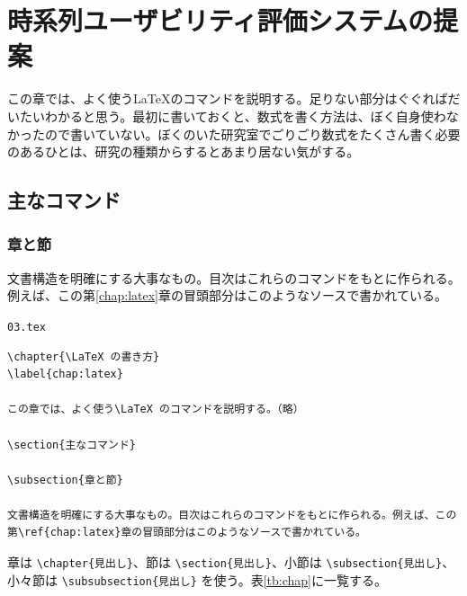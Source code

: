 \chapter{時系列ユーザビリティ評価システムの提案}
\label{chap:sequential}

この章では、よく使う\LaTeX のコマンドを説明する。足りない部分はぐぐればだいたいわかると思う。最初に書いておくと、数式を書く方法は、ぼく自身使わなかったので書いていない。ぼくのいた研究室でごりごり数式をたくさん書く必要のあるひとは、研究の種類からするとあまり居ない気がする。

\section{主なコマンド}

\subsection{章と節}

文書構造を明確にする大事なもの。目次はこれらのコマンドをもとに作られる。例えば、この第\ref{chap:latex}章の冒頭部分はこのようなソースで書かれている。

\begin{itembox}[l]{{\tt 03.tex}}
\begin{verbatim}
\chapter{\LaTeX の書き方}
\label{chap:latex}

この章では、よく使う\LaTeX のコマンドを説明する。（略）

\section{主なコマンド}

\subsection{章と節}

文書構造を明確にする大事なもの。目次はこれらのコマンドをもとに作られる。例えば、この第\ref{chap:latex}章の冒頭部分はこのようなソースで書かれている。
\end{verbatim}
\end{itembox}

章は \verb|\chapter{見出し}|、節は \verb|\section{見出し}|、小節は \verb|\subsection{見出し}|、小々節は \verb|\subsubsection{見出し}| を使う。表\ref{tb:chap}に一覧する。

